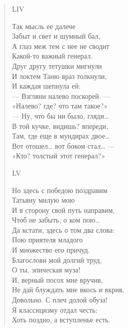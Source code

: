 \begin{verse}
LIV

Так мысль ее далече\\
Забыт и свет и шумный бал,\\
А глаз меж тем с нее не сводит\\
Какой-то важный генерал.\\
Друг другу тетушки мигнули\\
И локтем Таню враз толкнули,\\
И каждая шепнула ей:\\
— Взгляни налево поскорей. —\\
«Налево? где? что там такое?»\\
— Ну, что бы ни было, гляди…\\
В той кучке, видишь? впереди,\\
Там, где еще в мундирах двое…\\
Вот отошел… вот боком стал… —\\
«Кто? толстый этот генерал?»

LV

Но здесь с победою поздравим\\
Татьяну милую мою\\
И в сторону свой путь направим,\\
Чтоб не забыть, о ком пою…\\
Да кстати, здесь о том два слова:\\
Пою приятеля младого\\
И множество его причуд.\\
Благослови мой долгий труд,\\
О ты, эпическая муза!\\
И, верный посох мне вручив,\\
Не дай блуждать мне вкось и вкрив.\\
Довольно. С плеч долой обуза!\\
Я классицизму отдал честь:\\
Хоть поздно, а вступленье есть.
\end{verse}
